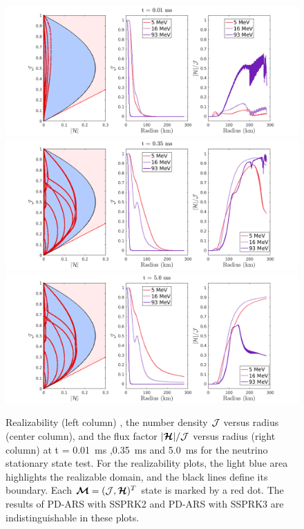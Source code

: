 \begin{figure}[h]
  \centering
    \includegraphics[width=\textwidth]{figures/NSS_1_1}\\
    \includegraphics[width=\textwidth]{figures/NSS_3_1} \\
    \includegraphics[width=\textwidth]{figures/NSS_5_1} \\
    \caption{Realizability (left column) , the number density $\mathcal{J}$ versus radius (center column), and the flux factor $|\boldsymbol{\mathcal{H}}|/\mathcal{J}$ versus radius (right column) at t = 0.01~ms ,0.35~ms and 5.0~ms for the neutrino stationary state test. For the realizability plots, the light blue area highlights the realizable domain, and the black lines define its boundary. Each $\boldsymbol{\mathcal{M}}=(\mathcal{J},\boldsymbol{\mathcal{H}})^{T}$ state is marked by a red dot. The results of PD-ARS with SSPRK2 and PD-ARS with SSPRK3 are indistinguishable in these plots.}
    \label{fig:NeutrinoStationaryTestEvolve}
\end{figure}

\clearpage